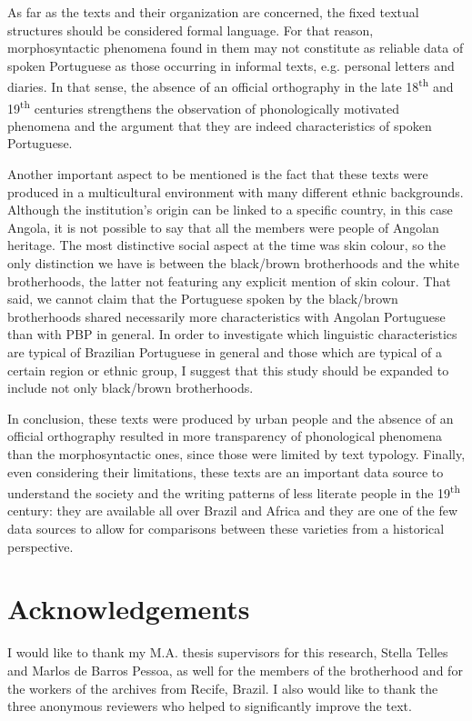 \documentclass[output=paper,colorlinks,citecolor=brown]{langscibook}
\begin{document}
As far as the texts and their organization are concerned, the fixed textual structures should be considered formal language.  For that reason, morphosyntactic phenomena found in them may not constitute as reliable data of spoken Portuguese as those occurring in informal texts, e.g. personal letters and diaries. In that sense, the absence of an official orthography in the late 18\textsuperscript{th} and 19\textsuperscript{th} centuries strengthens the observation of phonologically motivated phenomena and the argument that they are indeed characteristics of spoken Portuguese.

Another important aspect to be mentioned is the fact that these texts were produced in a multicultural environment with many different ethnic backgrounds. Although the institution’s origin can be linked to a specific country, in this case Angola, it is not possible to say that all the members were people of Angolan heritage. The most distinctive social aspect at the time was skin colour, so the only distinction we have is between the black/brown brotherhoods and the white brotherhoods, the latter not featuring any explicit mention of skin colour. That said, we cannot claim that the Portuguese spoken by the black/brown brotherhoods shared necessarily more characteristics with Angolan Portuguese than with PBP in general. In order to investigate which linguistic characteristics are typical of Brazilian Portuguese in general and those  which are typical of a certain region or ethnic group, I suggest that this study should be expanded to include not only black/brown brotherhoods.

In conclusion, these texts were produced by urban people and the absence of an official orthography resulted in more transparency of phonological phenomena than the morphosyntactic ones, since those were limited by text typology. Finally, even considering their limitations, these texts are an important data source to understand the society and the writing patterns of less literate people in the 19\textsuperscript{th} century: they are available all over Brazil and Africa and they are one of the few data sources to allow for comparisons between these varieties from a historical perspective.

\section*{Acknowledgements}
I would like to thank my M.A. thesis supervisors for this research, Stella Telles and Marlos de Barros Pessoa, as well for the members of the brotherhood and for the workers of the archives from Recife, Brazil. I also would like to thank the three anonymous reviewers who helped to significantly improve the text.
\end{document}
